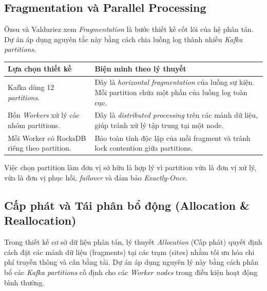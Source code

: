 \documentclass[12pt,a4paper]{article}
\begin{document}
\subsection{Fragmentation và Parallel Processing}

Özsu và Valduriez xem \textit{Fragmentation} là bước thiết kế cốt lõi của hệ phân tán. Dự án áp dụng nguyên tắc này bằng cách chia luồng log thành nhiều \textit{Kafka partitions}.

\begin{longtable}{p{} p{}}
\toprule
\textbf{Lựa chọn thiết kế} & \textbf{Biện minh theo lý thuyết} \\
\midrule
\endhead
Kafka dùng 12 \textit{partitions}. & Đây là \textit{horizontal fragmentation} của luồng sự kiện. Mỗi partition chứa một phần của luồng log toàn cục. \\
Bốn \textit{Workers} xử lý các nhóm partitions. & Đây là \textit{distributed processing} trên các mảnh dữ liệu, giúp tránh xử lý tập trung tại một node. \\
Mỗi Worker có RocksDB riêng theo partition. & Bảo toàn tính độc lập của mỗi fragment và tránh lock contention giữa partitions. \\
\bottomrule
\end{longtable}

Việc chọn partition làm đơn vị sở hữu là hợp lý vì partition vừa là đơn vị xử lý, vừa là đơn vị phục hồi, \textit{failover} và đảm bảo \textit{Exactly-Once}.

\subsection{Cấp phát và Tái phân bổ động (Allocation \& Reallocation)}

Trong thiết kế cơ sở dữ liệu phân tán, lý thuyết \textit{Allocation} (Cấp phát) quyết định cách đặt các mảnh dữ liệu (fragments) tại các trạm (sites) nhằm tối ưu hóa chi phí truyền thông và cân bằng tải. Dự án áp dụng nguyên lý này bằng cách phân bổ các \textit{Kafka partitions} cố định cho các \textit{Worker nodes} trong điều kiện hoạt động bình thường.
\end{document}
